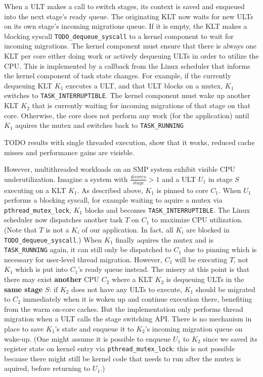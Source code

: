 \documentclass[12pt,a4paper]{book}
\begin{document}
When a ULT makes a call to switch stages, its context is saved and enqueued into the next stage's ready queue.
The originating KLT now waits for new ULTs on its own stage's incoming migrations queue.
If it is empty, the KLT makes a blocking syscall \texttt{TODO\_dequeue\_syscall} to a kernel component to wait for incoming migrations.
The kernel component must ensure that there is always one KLT per core either doing work or actively dequeuing ULTs in order to utilize the CPU.
This is implemented by a callback from the Linux scheduler that informs the kernel component of task state changes.
For example, if the currently dequeuing KLT $K_1$ executes a ULT, and that ULT blocks on a mutex, $K_1$ switches to \texttt{TASK\_INTERRUPTIBLE}.
The kernel component must wake up another KLT $K_2$ that is currently waiting for incoming migrations of that stage on that core.
Otherwise, the core does not perform any work (for the application) until $K_1$ aquires the mutex and switches back to \texttt{TASK\_RUNNING}

TODO results with single threaded execution, show that it works, reduced cache misses and performance gains are visisble.

However, multithreaded workloads on an SMP system exhibit visible CPU underutilization.
Imagine a system with $\frac{\#cores}{stage} > 1$ and a ULT $U_1$ in stage $S$ executing on a KLT $K_1$.
As described above, $K_1$ is pinned to core $C_1$.
When $U_1$ performs a blocking syscall, for example waiting to aquire a mutex via \texttt{pthread\_mutex\_lock}, $K_1$ blocks and becomes \texttt{TASK\_INTERRUPTIBLE}.
The Linux scheduler now dispatches another task $T$ on $C_1$ to maximize CPU utilization.
(Note that $T$ is not a $K_i$ of our application. In fact, all $K_i$ are blocked in \texttt{TODO\_dequeue\_syscall}.)
When $K_1$ finally aquires the mutex and is \texttt{TASK\_RUNNING} again, it can still only be dispatched to $C_1$ due to pinning which is necessary for user-level thread migration.
However, $C_1$ will be executing $T$, not $K_1$ which is put into $C_1$'s ready queue instead.
The misery at this point is that there may exist \textbf{another} CPU $C_2$ where a KLT $K_2$ is dequeuing ULTs in the \textbf{same stage} $S$:
if $K_2$ does not have any ULTs to execute, $K_1$ should be migrated to $C_2$ immediately when it is woken up and continue execution there, benefiting from the warm on-core caches.
But the implementation only performs thread migration when a ULT calls the stage switching API.
There is no mechanism in place to save $K_1$'s state and enqueue it to $K_2$'s incoming migration queue on wake-up.
(One might assume it is possible to enqueue $U_1$ to $K_2$ since we saved its register state on kernel entry via \texttt{pthread\_mutex\_lock}:
this is not possible because there might still be kernel code that needs to run after the mutex is aquired, before returning to $U_1$.)
\end{document}

